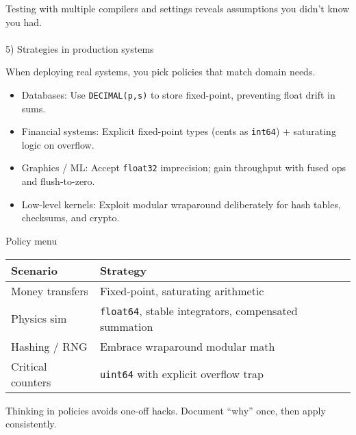 \documentclass[
  letterpaper,
  DIV=11,
  numbers=noendperiod]{scrreprt}
\makeatletter
\let\oldparagraph\paragraph
\renewcommand{\paragraph}{
    \@ifstar
      \xxxParagraphStar
      \xxxParagraphNoStar
  }
\newcommand{\xxxParagraphStar}[1]{\oldparagraph*{#1}\mbox{}}
\newcommand{\xxxParagraphNoStar}[1]{\oldparagraph{#1}\mbox{}}
\providecommand{\tightlist}{%
  \setlength{\itemsep}{0pt}\setlength{\parskip}{0pt}}
\makeatother
\begin{document}
Testing with multiple compilers and settings reveals assumptions you
didn't know you had.

\paragraph{5) Strategies in production
systems}\label{strategies-in-production-systems}

When deploying real systems, you pick policies that match domain needs.

\begin{itemize}
\tightlist
\item
  Databases: Use \texttt{DECIMAL(p,s)} to store fixed-point, preventing
  float drift in sums.
\item
  Financial systems: Explicit fixed-point types (cents as
  \texttt{int64}) + saturating logic on overflow.
\item
  Graphics / ML: Accept \texttt{float32} imprecision; gain throughput
  with fused ops and flush-to-zero.
\item
  Low-level kernels: Exploit modular wraparound deliberately for hash
  tables, checksums, and crypto.
\end{itemize}

Policy menu

\begin{longtable}[]{@{}
  >{\raggedright\arraybackslash}p{}
  >{\raggedright\arraybackslash}p{}@{}}
\toprule\noalign{}
\begin{minipage}[b]{\linewidth}\raggedright
Scenario
\end{minipage} & \begin{minipage}[b]{\linewidth}\raggedright
Strategy
\end{minipage} \\
\midrule\noalign{}
\endhead
\bottomrule\noalign{}
\endlastfoot
Money transfers & Fixed-point, saturating arithmetic \\
Physics sim & \texttt{float64}, stable integrators, compensated
summation \\
Hashing / RNG & Embrace wraparound modular math \\
Critical counters & \texttt{uint64} with explicit overflow trap \\
\end{longtable}

Thinking in policies avoids one-off hacks. Document ``why'' once, then
apply consistently.
\end{document}
